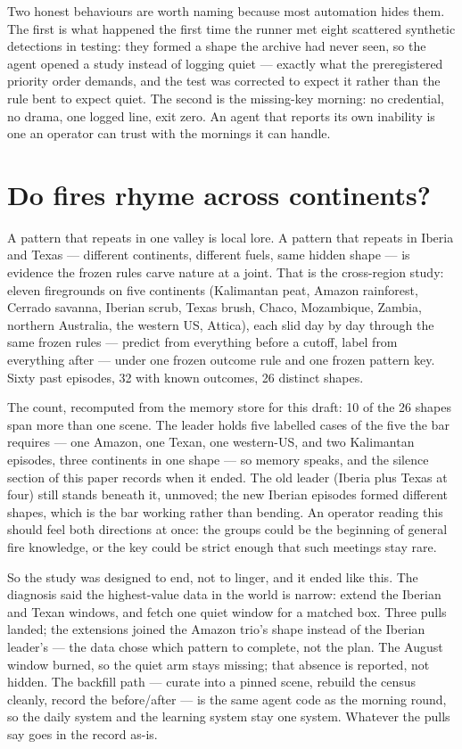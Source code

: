 \documentclass[11pt]{article}
\begin{document}
Two honest behaviours are worth naming because most automation hides them.
The first is what happened the first time the runner met eight scattered
synthetic detections in testing: they formed a shape the archive had never
seen, so the agent opened a study instead of logging quiet — exactly what
the preregistered priority order demands, and the test was corrected to
expect it rather than the rule bent to expect quiet. The second is the
missing-key morning: no credential, no drama, one logged line, exit zero.
An agent that reports its own inability is one an operator can trust with
the mornings it can handle.

\section{Do fires rhyme across continents?}
\label{sec:crossregion}

A pattern that repeats in one valley is local lore. A pattern that repeats
in Iberia and Texas — different continents, different fuels, same hidden
shape — is evidence the frozen rules carve nature at a joint. That is the
cross-region study: eleven firegrounds on five continents (Kalimantan peat,
Amazon rainforest, Cerrado savanna, Iberian scrub, Texas brush, Chaco,
Mozambique, Zambia, northern Australia, the western US, Attica), each slid
day by day through the same frozen rules — predict from everything before a
cutoff, label from everything after — under one frozen outcome rule and one
frozen pattern key. Sixty past episodes, 32 with known outcomes, 26
distinct shapes.

The count, recomputed from the memory store for this draft: 10 of the 26
shapes span more than one scene. The leader holds five labelled cases of
the five the bar requires — one Amazon, one Texan, one western-US, and two
Kalimantan episodes, three continents in one shape — so memory speaks, and
the silence section of this paper records when it ended. The old leader
(Iberia plus Texas at four) still stands beneath it, unmoved; the new
Iberian episodes formed different shapes, which is the bar working rather
than bending. An operator reading this should feel both directions at once:
the groups could be the beginning of general fire knowledge, or the key
could be strict enough that such meetings stay rare.

So the study was designed to end, not to linger, and it ended like this.
The diagnosis said the highest-value data in the world is narrow: extend
the Iberian and Texan windows, and fetch one quiet window for a matched
box. Three pulls landed; the extensions joined the Amazon trio's shape
instead of the Iberian leader's — the data chose which pattern to complete,
not the plan. The August window burned, so the quiet arm stays missing;
that absence is reported, not hidden. The backfill path — curate into a
pinned scene, rebuild the census cleanly, record the before/after — is the
same agent code as the morning round, so the daily system and the learning
system stay one system. Whatever the pulls say goes in the record as-is.
\end{document}
